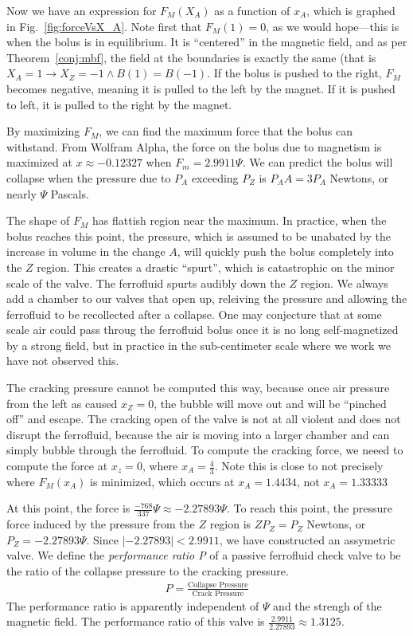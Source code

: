 \documentclass{asme2ej}
\begin{document}
Now we have an expression for $F_M(X_A)$ as a function of $x_A$,
which is graphed in Fig.~\ref{fig:forceVsX_A}.
Note first that $F_M(1) = 0$, as we would hope---this is when
the bolus is in equilibrium. It is ``centered'' in the magnetic
field, and as per Theorem~\ref{conj:mbf}, the field at the boundaries
is exactly the same (that is $X_A = 1 \rightarrow X_Z = -1 \wedge
B(1) = B(-1)$.
If the bolus is pushed to the right, $F_M$ becomes negative, meaning
it is pulled to the left by the magnet. If it is pushed to left,
it is pulled to the right by the magnet.

By maximizing $F_M$, we can find the maximum force that the bolus can withstand.
From Wolfram Alpha,
the force on the bolus due to magnetism is maximized at $x \approx -0.12327$
when $F_m = 2.9911 \Psi$. We can predict the bolus will collapse when the
pressure due to $P_A$ exceeding $P_Z$ is $P_A A = 3 P_A$ Newtons, or
nearly $\Psi$ Pascals.

The shape of  $F_M$ has flattish region near the maximum. In practice,
when the bolus reaches this point, the pressure, which is assumed to
be unabated by the increase in volume in the change $A$, will quickly
push the bolus completely into the $Z$ region. This creates a drastic
``spurt'', which is catastrophic on the minor scale of the valve.
The ferrofluid spurts audibly down the $Z$ region. We always
add a chamber to our valves that open up, releiving the pressure and
allowing the ferrofluid to be recollected after a collapse.
One may conjecture that at some scale air could pass throug the
ferrofluid bolus once it is no long self-magnetized by a strong
field, but in practice in the sub-centimeter scale where we work
we have not observed this.

The cracking pressure cannot be computed this way, because once
air pressure from the left as caused $x_Z = 0$, the bubble will move
out and will be ``pinched off'' and escape.
The cracking open of the valve is not at all violent and does not
disrupt the ferrofluid, because the air is moving into a larger
chamber and can simply bubble through the ferrofluid.
To compute the cracking force, we neeed to compute the force at $x_z = 0$,
where $x_A = \frac{4}{3}$. Note this is close to not precisely where $F_M(x_A)$
is minimized, which occurs at $x_A = 1.4434$, not $x_A = 1.33333$

At this point, the force is $\frac{-768}{337}  \Psi \approx -2.27893  \Psi$.
To reach this point, the pressure force induced by the pressure from the $Z$
region is $Z P_Z = P_Z $ Newtons, or $P_Z = -2.27893  \Psi$.
Since $|-2.27893| < 2.9911 $, we have constructed an assymetric valve.
We define the {\em performance ratio P} of a passive ferrofluid check valve
to be the ratio of the collapse pressure to the cracking pressure.
\begin{align}
  P = \frac{\text{Collapse Pressure}}{\text{Crack Pressure}}
\end{align}
The performance ratio is apparently independent of $\Psi$ and the strengh
of the magnetic field.
The performance ratio of this valve is $\frac{2.9911}{2.27893} \approx 1.3125$.
\end{document}
